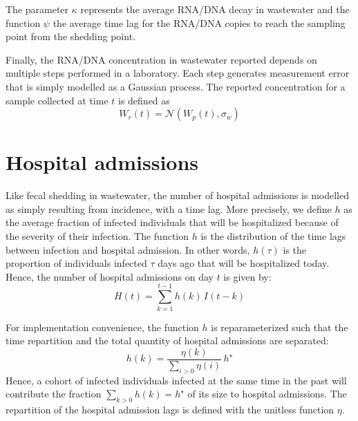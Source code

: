 \documentclass[11pt]{article} %
\newcommand{\warning}[1]{\textcolor{RedOrange}{\textbf{#1}}}
\begin{document}
The parameter $\kappa$ represents the average RNA/DNA decay in wastewater and the function $\psi$ the average time lag for the RNA/DNA copies to reach the sampling point from the shedding point.

Finally, the RNA/DNA concentration in wastewater reported depends on multiple steps performed in a laboratory. Each step generates measurement error that is simply modelled as a Gaussian process. 
The reported concentration for a sample collected at time $t$ is defined as
\begin{equation}
W_r(t) = \mathcal{N}(W_p(t), \sigma_w)
\end{equation}



\section{Hospital admissions}

Like fecal shedding in wastewater, the number of hospital admissions is modelled as simply resulting from incidence, with a time lag. 
More precisely, we define $h$ as the average fraction of infected individuals that will be hospitalized because of the severity of their infection. 
The function $h$ is the distribution of the time lags between infection and hospital admission. In other words, $h(\tau)$ is the proportion of individuals infected $\tau$ days ago that will be hospitalized today. 
Hence, the number of hospital admissions on day $t$ is given by:
\begin{equation}
H(t) = \sum_{k=1}^{t-1} h(k) \, I(t-k)
\end{equation}

For implementation convenience, the function $h$ is reparameterized such that the time repartition and the total quantity of hospital admissions are separated:
\begin{equation}
h(k) = \frac{\eta(k)}{\sum_{i>0}\eta(i)} \, h^\star
\end{equation}
Hence, a cohort of infected individuals infected at the same time in the past will contribute the fraction $\sum_{k>0} h(k) =  h^\star$ of its size to hospital admissions. The repartition of the hospital admission lags is defined with the unitless function $\eta$.



%
%
%
%
%
%
\end{document}
